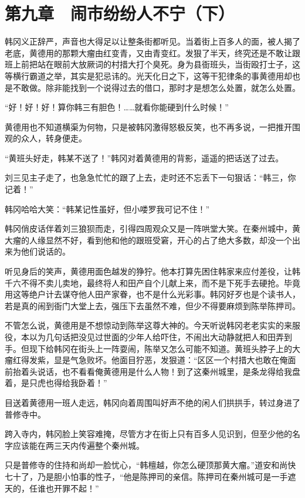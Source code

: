 \section{第九章　闹市纷纷人不宁（下）}

韩冈义正辞严，声音也大得足以让整条街都听见。当着街上百多人的面，被人揭了老底，黄德用的那颗大瘤由红变青，又由青变红。发狠了半天，终究还是不敢让跟班上前把站在眼前大放厥词的村措大打个臭死。身为县衙班头，当街殴打士子，这等横行霸道之举，其实是犯忌讳的。光天化日之下，这等干犯律条的事黄德用却也是不敢做。除非能找到一个说得过去的借口，那时才是想怎么处置，就怎么处置。

“好！好！好！算你韩三有胆色！……就看你能硬到什么时候！”

黄德用也不知道横渠为何物，只是被韩冈激得怒极反笑，也不再多说，一把推开围观的众人，转身便走。

“黄班头好走，韩某不送了！”韩冈对着黄德用的背影，遥遥的把话送了过去。

刘三见主子走了，也急急忙忙的跟了上去，走时还不忘丢下一句狠话：“韩三，你记着！”

韩冈哈哈大笑：“韩某记性虽好，但小喽罗我可记不住！”

韩冈俏皮话伴着刘三狼狈而走，引得四周观众又是一阵哄堂大笑。在秦州城中，黄大瘤的人缘显然不好，看到他和他的跟班受窘，开心的占了绝大多数，却没一个出来为他们说话的。

听见身后的笑声，黄德用面色越发的狰狞。他本打算先困住韩家来应付差役，让韩千六不得不卖儿卖地，最终将人和田产自个儿献上来，而不是下死手去硬抢。毕竟用这等绝户计去谋夺他人田产家眷，也不是什么光彩事。韩冈好歹也是个读书人，若是真的闹到衙门大堂上去，强压下去虽然不难，但少不得要麻烦到陈举陈押司。

不管怎么说，黄德用是不想惊动到陈举这尊大神的。今天听说韩冈老老实实的来服役，本以为几句话把没见过世面的少年人给吓住，不闹出大动静就把人和田弄到手。但现下给韩冈在街头上一阵耍闹，陈举又怎么可能不知道。黄班头脖子上的大瘤红得发紫，显是气急败坏。他面目狞恶，发狠道：“区区一个村措大也敢在俺面前抬着头说话，也不看看俺黄德用是什么人物！到了这秦州城里，是条龙得给我盘着，是只虎也得给我卧着！”

目送着黄德用一班人走远，韩冈向着周围叫好声不绝的闲人们拱拱手，转过身进了普修寺中。

跨入寺内，韩冈脸上笑容难掩，尽管方才在街上只有百多人见识到，但至少他的名字应该能在两三天内传遍整个秦州城。

只是普修寺的住持和尚却一脸忧心，“韩檀越，你怎么硬顶那黄大瘤。”道安和尚快七十了，乃是胆小怕事的性子，“他是陈押司的亲信。陈押司在秦州城可是一手遮天的，任谁也开罪不起！”

